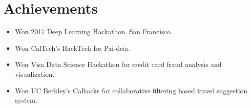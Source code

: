 \newcommand\textlcsc[1]{\textsc{\MakeTextLowercase{#1}}}
\section{Achievements}
\begin{itemize}
\setlength\itemsep{-0.5em}
\item Won 2017 Deep Learning Hackathon, San Francisco.
\item Won CalTech's HackTech for Pai-deia.
\item Won Visa Data Science Hackathon for credit card fraud analysis and visualization.
\item Won UC Berkley's Calhacks for collaborative filtering based travel suggestion system.
\end{itemize}
